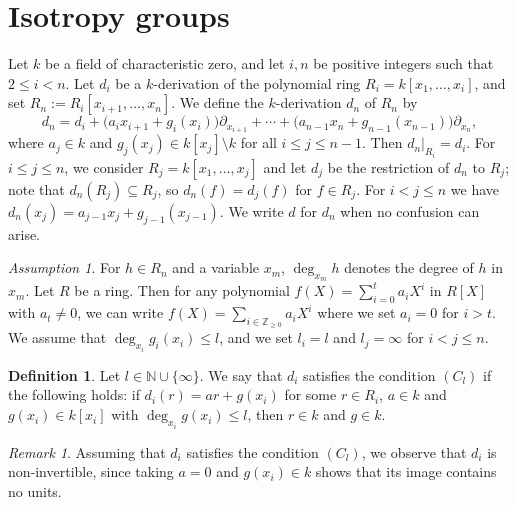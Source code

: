 \documentclass[11pt]{amsart}
\theoremstyle{definition}
\newtheorem{definition}[theorem]{Definition}
\theoremstyle{remark}
\newtheorem{remark}[theorem]{Remark}
\newtheorem{assumption}[theorem]{Assumption}
\numberwithin{equation}{theorem}
\newcommand{\N}{\mathbb{N}}
\begin{document}
\section{Isotropy groups}

Let $k$ be a field of characteristic zero, and let $i,n$ be positive integers such that
$2\le i<n$. Let $d_i$ be a $k$-derivation of the polynomial ring $R_i=k[x_1,\dots,x_i]$, and set
$R_n:=R_i[x_{i+1},\dots,x_n]$. We define the $k$-derivation $d_n$ of $R_n$ by
\begin{equation}\label{eq:dn}
d_n=d_i+\bigl(a_ix_{i+1}+g_i(x_i)\bigr)\partial_{x_{i+1}}+\cdots+\bigl(a_{n-1}x_n+g_{n-1}(x_{n-1})\bigr)\partial_{x_n},
\end{equation}
where $a_j\in k$ and $g_j(x_j)\in k[x_j]\setminus k$ for all $i\le j\le n-1$. Then $d_n|_{R_i}=d_i$.
For $i\le j\le n$, we consider $R_j=k[x_1,\dots,x_j]$ and let $d_j$ be the restriction of $d_n$ to $R_j$;
note that $d_n(R_j)\subseteq R_j$, so $d_n(f)=d_j(f)$ for $f\in R_j$. For $i<j\le n$ we have
$d_n(x_j)=a_{j-1}x_j+g_{j-1}(x_{j-1})$. We write $d$ for $d_n$ when no confusion can arise.

\begin{assumption} 
For $h\in R_n$ and a variable $x_m$, $\deg_{x_m}h$ denotes the degree of $h$ in $x_m$. Let $R$ be a ring. Then for any polynomial $f(X)=\sum_{i=0}^t a_i X^i$ in $R[X]$ with $a_t\neq 0$, we can write $f(X)=\sum_{i\in \mathbb{Z}_{\geq 0}}a_i X^i$ where we set $a_i=0$ for $i>t$. We assume that $\deg_{x_i}g_i(x_i)\le l$, and we set $l_i=l$ and $l_j=\infty$ for $i<j\leq n$.
\end{assumption}


\begin{definition}\label{def:C}
Let $l\in\N\cup\{\infty\}$. We say that $d_i$ satisfies the condition $(C_l)$ if the following holds:
if $d_i(r)=ar+g(x_i)$ for some $r\in R_i$, $a\in k$ and $g(x_i)\in k[x_i]$ with
$\deg_{x_i}g(x_i)\le l$, then $r\in k$ and $g\in k$.
\end{definition}

\begin{remark}
Assuming that $d_i$ satisfies the condition $(C_l)$, we observe that $d_i$ is non-invertible, since taking $a=0$ and $g(x_i)\in k$ shows that its image contains no units.
\end{remark}
\end{document}
